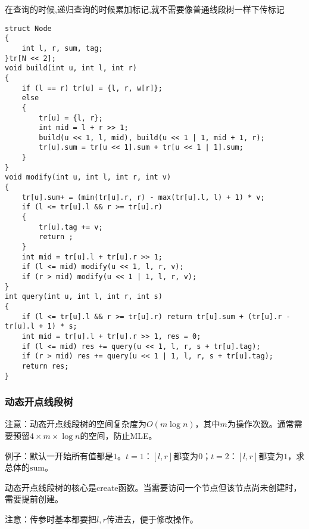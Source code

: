 \documentclass[a4paper,fontset=none]{ctexart}
\begin{document}
在查询的时候,递归查询的时候累加标记,就不需要像普通线段树一样下传标记
\begin{verbatim}
struct Node
{
    int l, r, sum, tag;
}tr[N << 2];
void build(int u, int l, int r)
{
    if (l == r) tr[u] = {l, r, w[r]};
    else
    {
        tr[u] = {l, r};
        int mid = l + r >> 1;
        build(u << 1, l, mid), build(u << 1 | 1, mid + 1, r);
        tr[u].sum = tr[u << 1].sum + tr[u << 1 | 1].sum;
    }
}
void modify(int u, int l, int r, int v)
{
    tr[u].sum+ = (min(tr[u].r, r) - max(tr[u].l, l) + 1) * v;
    if (l <= tr[u].l && r >= tr[u].r)
    {
        tr[u].tag += v;
        return ;
    }
    int mid = tr[u].l + tr[u].r >> 1;
    if (l <= mid) modify(u << 1, l, r, v);
    if (r > mid) modify(u << 1 | 1, l, r, v);
}
int query(int u, int l, int r, int s)
{
    if (l <= tr[u].l && r >= tr[u].r) return tr[u].sum + (tr[u].r - tr[u].l + 1) * s;
    int mid = tr[u].l + tr[u].r >> 1, res = 0;
    if (l <= mid) res += query(u << 1, l, r, s + tr[u].tag);
    if (r > mid) res += query(u << 1 | 1, l, r, s + tr[u].tag);
    return res;
}
\end{verbatim}
\subsubsection{动态开点线段树}
注意：动态开点线段树的空间复杂度为$O(m\log n)$，其中$m$为操作次数。通常需要预留$4 \times m \times \log n$的空间，防止MLE。

例子：默认一开始所有值都是$1$。$t=1$：$[l,r]$都变为$0$；$t=2$：$[l,r]$都变为$1$，求总体的$\text{sum}$。

动态开点线段树的核心是create函数。当需要访问一个节点但该节点尚未创建时，需要提前创建。

注意：传参时基本都要把$l,r$传进去，便于修改操作。
\end{document}
